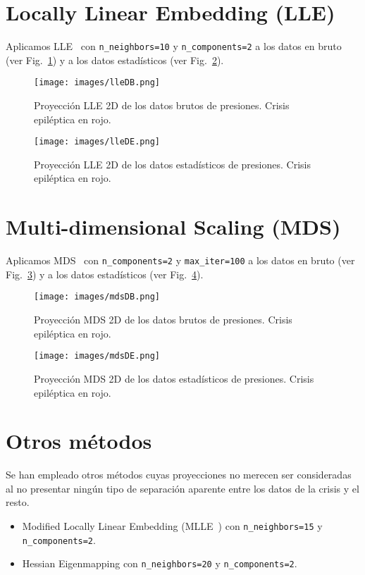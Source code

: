 \documentclass[a4paper,12pt,twoside,oldfontcommands]{memoir}
\begin{document}
	\section{Locally Linear Embedding (LLE)}
	Aplicamos LLE~\cite{roweis2000nonlinear} con \texttt{n\_neighbors=10} y \texttt{n\_components=2} a los datos en bruto (ver Fig.~\ref{fig:lleDB}) y a los datos estadísticos (ver Fig.~\ref{fig:lleDE}).
	\begin{figure}
		\centering
		\texttt{[image: images/lleDB.png]}
		\caption{Proyección LLE 2D de los datos brutos de presiones. Crisis epiléptica en rojo.}
		\label{fig:lleDB}
	\end{figure}
	\begin{figure}
		\centering
		\texttt{[image: images/lleDE.png]}
		\caption{Proyección LLE 2D de los datos estadísticos de presiones. Crisis epiléptica en rojo.}
		\label{fig:lleDE}
	\end{figure}
	\section{Multi-dimensional Scaling (MDS)}
	Aplicamos MDS~\cite{kruskal1964nonmetric,borg2003modern} con \texttt{n\_components=2} y \texttt{max\_iter=100} a los datos en bruto (ver Fig.~\ref{fig:mdsDB}) y a los datos estadísticos (ver Fig.~\ref{fig:mdsDE}).
	\begin{figure}
		\centering
		\texttt{[image: images/mdsDB.png]}
		\caption{Proyección MDS 2D de los datos brutos de presiones. Crisis epiléptica en rojo.}
		\label{fig:mdsDB}
	\end{figure}
	\begin{figure}
		\centering
		\texttt{[image: images/mdsDE.png]}
		\caption{Proyección MDS 2D de los datos estadísticos de presiones. Crisis epiléptica en rojo.}
		\label{fig:mdsDE}
	\end{figure}
	\section{Otros métodos}
	Se han empleado otros métodos cuyas proyecciones no merecen ser consideradas al no presentar ningún tipo de separación aparente entre los datos de la crisis y el resto. 
	\begin{itemize}
		\item Modified Locally Linear Embedding (MLLE~\cite{zhang2007mlle}) con \texttt{n\_neighbors=15} y \texttt{n\_components=2}.
		\item Hessian Eigenmapping con \texttt{n\_neighbors=20} y \texttt{n\_components=2}. 
	\end{itemize}
\end{document}
